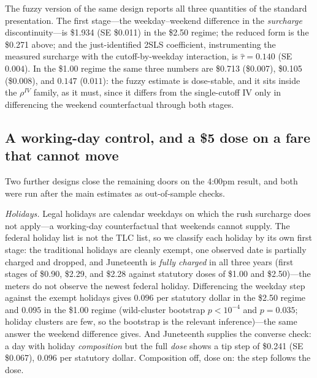 The fuzzy version of the same design reports all three quantities of
the standard presentation. The first stage---the weekday--weekend
difference in the \emph{surcharge} discontinuity---is \$1.934 (SE
\$0.011) in the \$2.50 regime; the reduced form is the \$0.271 above;
and the just-identified 2SLS coefficient, instrumenting the measured
surcharge with the cutoff-by-weekday interaction, is
$\hat{\tau} = 0.140$ (SE $0.004$). In the \$1.00 regime the same three
numbers are \$0.713 (\$0.007), \$0.105 (\$0.008), and $0.147$
($0.011$): the fuzzy estimate is dose-stable, and it sits inside the
$\rho^{IV}$ family, as it must, since it differs from the single-cutoff
IV only in differencing the weekend counterfactual through both
stages.

\subsection{A working-day control, and a \$5 dose on a fare that cannot move}
\label{sec:results-controls}
Two further designs close the remaining doors on the 4:00pm result, and
both were run after the main estimates as out-of-sample checks.

\emph{Holidays.} Legal holidays are calendar weekdays on which the rush
surcharge does not apply---a working-day counterfactual that weekends
cannot supply. The federal holiday list is not the TLC list, so we
classify each holiday by its own first stage: the traditional holidays
are cleanly exempt, one observed date is partially charged and dropped,
and Juneteenth is \emph{fully charged} in all three years (first stages
of \$0.90, \$2.29, and \$2.28 against statutory doses of \$1.00 and
\$2.50)---the meters do not observe the newest federal holiday.
Differencing the weekday step against the exempt holidays gives $0.096$
per statutory dollar in the \$2.50 regime and $0.095$ in the \$1.00
regime (wild-cluster bootstrap $p < 10^{-4}$ and $p = 0.035$; holiday
clusters are few, so the bootstrap is the relevant inference)---the
same answer the weekend difference gives. And Juneteenth supplies the
converse check: a day with holiday \emph{composition} but the full
\emph{dose} shows a tip step of \$0.241 (SE \$0.067), $0.096$ per
statutory dollar. Composition off, dose on: the step follows the dose.

